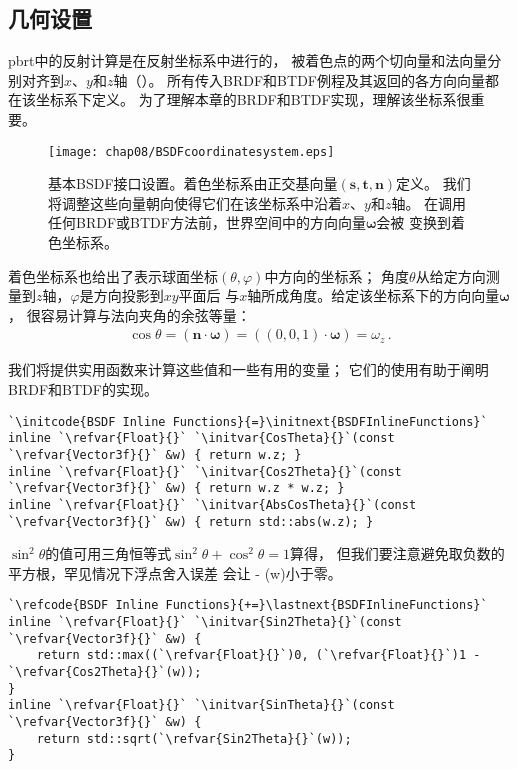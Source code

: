 \subsection{几何设置}\label{sub:几何设置}
pbrt中的反射计算是在反射坐标系中进行的，
被着色点的两个切向量和法向量分别对齐到$x$、$y$和$z$轴（）。
所有传入BRDF和BTDF例程及其返回的各方向向量都在该坐标系下定义。
为了理解本章的BRDF和BTDF实现，理解该坐标系很重要。
\begin{figure}[htbp]
      \centering
      \texttt{[image: chap08/BSDFcoordinatesystem.eps]}
      \caption{基本BSDF接口设置。着色坐标系由正交基向量$({\bm s},{\bm t},{\bm n})$定义。
            我们将调整这些向量朝向使得它们在该坐标系中沿着$x$、$y$和$z$轴。
            在调用任何BRDF或BTDF方法前，世界空间中的方向向量$\bm \omega$会被
            变换到着色坐标系。}
      \label{fig:8.2}
\end{figure}

着色坐标系也给出了表示球面坐标$(\theta,\varphi)$中方向的坐标系；
角度$\theta$从给定方向测量到$z$轴，$\varphi$是方向投影到$xy$平面后
与$x$轴所成角度。给定该坐标系下的方向向量$\bm\omega$，
很容易计算与法向夹角的余弦等量：
\begin{align*}
      \cos\theta=({\bm n}\cdot{\bm\omega})=((0,0,1)\cdot{\bm\omega})=\omega_z\, .
\end{align*}

我们将提供实用函数来计算这些值和一些有用的变量；
它们的使用有助于阐明BRDF和BTDF的实现。
\begin{lstlisting}
`\initcode{BSDF Inline Functions}{=}\initnext{BSDFInlineFunctions}`
inline `\refvar{Float}{}` `\initvar{CosTheta}{}`(const `\refvar{Vector3f}{}` &w) { return w.z; }
inline `\refvar{Float}{}` `\initvar{Cos2Theta}{}`(const `\refvar{Vector3f}{}` &w) { return w.z * w.z; }
inline `\refvar{Float}{}` `\initvar{AbsCosTheta}{}`(const `\refvar{Vector3f}{}` &w) { return std::abs(w.z); }
\end{lstlisting}

$\sin^2\theta$的值可用三角恒等式$\sin^2\theta+\cos^2\theta=1$算得，
但我们要注意避免取负数的平方根，罕见情况下浮点舍入误差
会让{ - (w)}小于零。
\begin{lstlisting}
`\refcode{BSDF Inline Functions}{+=}\lastnext{BSDFInlineFunctions}`
inline `\refvar{Float}{}` `\initvar{Sin2Theta}{}`(const `\refvar{Vector3f}{}` &w) {
    return std::max((`\refvar{Float}{}`)0, (`\refvar{Float}{}`)1 - `\refvar{Cos2Theta}{}`(w));
}
inline `\refvar{Float}{}` `\initvar{SinTheta}{}`(const `\refvar{Vector3f}{}` &w) {
    return std::sqrt(`\refvar{Sin2Theta}{}`(w));
}
\end{lstlisting}

